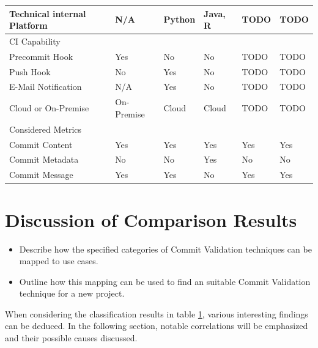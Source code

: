 \begin{table}[t]
\begin{tabular}{@{}llllll@{}}
		Technical internal Platform        & N/A        & Python & Java, R & TODO   & TODO  \\ \midrule
		CI Capability                      &            &        &         &        &       \\ \midrule
		Precommit Hook                     & Yes        & No     & No      & TODO   & TODO  \\
		Push Hook                          & No         & Yes    & No      & TODO   & TODO  \\
		E-Mail Notification                & N/A        & Yes    & No      & TODO   & TODO  \\
		Cloud or On-Premise                & On-Premise & Cloud  & Cloud   & TODO   & TODO  \\ \midrule
		Considered Metrics                 &            &        &         &        &       \\ \midrule
		Commit Content                     & Yes        & Yes    & Yes     & Yes    & Yes   \\
		Commit Metadata                    & No         & No     & Yes     & No     & No    \\
		Commit Message                     & Yes        & Yes    & No      & Yes    & Yes  
	\end{tabular}
	\label{tab:classification}
\end{table}

\section{Discussion of Comparison Results}
\label{sec:discussion}
\begin{itemize}
	\item Describe how the specified categories of Commit Validation techniques can be mapped to use cases.
	\item Outline how this mapping can be used to find an suitable Commit Validation technique for a new project.
\end{itemize}

When considering the classification results in table \ref{tab:classification}, various interesting findings can be deduced. In the following section, notable correlations will be emphasized and their possible causes discussed.

